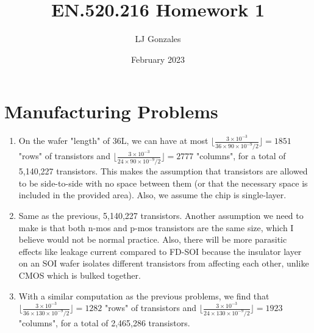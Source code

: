 \documentclass{article}
\title{EN.520.216 Homework 1}
\author{LJ Gonzales}
\date{February 2023}
\begin{document}
\maketitle
\section{Manufacturing Problems}
\begin{prob}
\begin{enumerate} 
	\item On the wafer "length" of 36L, we can have at most $\lfloor\frac{3\times10^{-3}}{36\times90\times10^{-9}/2}\rfloor=1851$ "rows" of transistors and $\lfloor\frac{3\times10^{-3}}{24\times90\times10^{-9}/2}\rfloor=2777$ "columns", for a total of 5,140,227 transistors. This makes the assumption that transistors are allowed to be side-to-side with no space between them (or that the necessary space is included in the provided area). Also, we assume the chip is single-layer.
\item Same as the previous, 5,140,227 transistors. Another assumption we need to make is that both n-mos and p-mos transistors are the same size, which I believe would not be normal practice. Also, there will be more parasitic effects like leakage current compared to FD-SOI because the insulator layer on an SOI wafer isolates different transistors from affecting each other, unlike CMOS which is bulked together.
\item With a similar computation as the previous problems, we find that $\lfloor\frac{3\times10^{-3}}{36\times130\times10^{-9}/2}\rfloor=1282$ "rows" of transistors and $\lfloor\frac{3\times10^{-3}}{24\times130\times10^{-9}/2}\rfloor=1923$ "columns", for a total of 2,465,286 transistors.  
\end{enumerate}
\end{prob}
\end{document}
